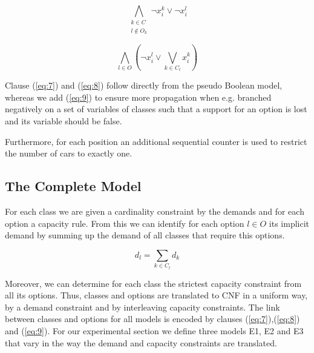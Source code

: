 \documentclass[]{llncs}
\begin{document}
\begin{equation} \label{eq:8}
    \bigwedge_{\substack{k \in C \\ l \not \in O_k}} \neg x^k_{i} \vee \neg x^l_{i}
\end{equation}

\begin{equation} \label{eq:9}
    \bigwedge_{l\in O} \left(\neg x^l_{i} \vee \bigvee_{k \in C_l} x^k_{i}\right)
\end{equation}

Clause (\ref{eq:7}) and (\ref{eq:8}) follow directly from the pseudo Boolean model, whereas we add (\ref{eq:9}) to
ensure more propagation when e.g. branched negatively on a set of variables of classes such that a support for an
option is lost and its variable should be false.

Furthermore, for each position an additional sequential counter is used to restrict the number of cars to exactly one. 

%

\subsection{The Complete Model}

For each class we are given a cardinality constraint by the demands and for each option a capacity rule. From this we
can identify for each option $l \in O$ its implicit demand by summing up the demand of all classes that require this options.

$$ d_l = \sum_{k\in C_l} d_k$$

Moreover, we can determine for each class the strictest capacity constraint from all its options. Thus, classes and
options are translated to CNF in a uniform way, by a demand constraint and by interleaving capacity constraints. The
link between classes and options for all models is encoded by clauses (\ref{eq:7}),(\ref{eq:8}) and (\ref{eq:9}). For
our experimental section we define three models E1, E2 and E3 that vary in the way the demand and capacity constraints
are translated. 
\end{document}
